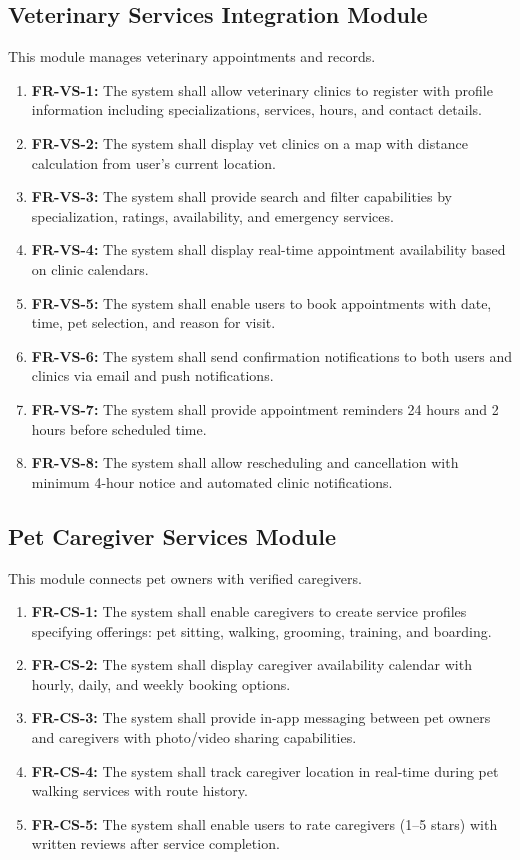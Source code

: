 \subsection{Veterinary Services Integration Module}
This module manages veterinary appointments and records.
\begin{enumerate}
    \item \textbf{FR-VS-1:} The system shall allow veterinary clinics to register with profile information including specializations, services, hours, and contact details.
    \item \textbf{FR-VS-2:} The system shall display vet clinics on a map with distance calculation from user's current location.
    \item \textbf{FR-VS-3:} The system shall provide search and filter capabilities by specialization, ratings, availability, and emergency services.
    \item \textbf{FR-VS-4:} The system shall display real-time appointment availability based on clinic calendars.
    \item \textbf{FR-VS-5:} The system shall enable users to book appointments with date, time, pet selection, and reason for visit.
    \item \textbf{FR-VS-6:} The system shall send confirmation notifications to both users and clinics via email and push notifications.
    \item \textbf{FR-VS-7:} The system shall provide appointment reminders 24 hours and 2 hours before scheduled time.
    \item \textbf{FR-VS-8:} The system shall allow rescheduling and cancellation with minimum 4-hour notice and automated clinic notifications.
\end{enumerate}

\subsection{Pet Caregiver Services Module}
This module connects pet owners with verified caregivers.
\begin{enumerate}
    \item \textbf{FR-CS-1:} The system shall enable caregivers to create service profiles specifying offerings: pet sitting, walking, grooming, training, and boarding.
    \item \textbf{FR-CS-2:} The system shall display caregiver availability calendar with hourly, daily, and weekly booking options.
    \item \textbf{FR-CS-3:} The system shall provide in-app messaging between pet owners and caregivers with photo/video sharing capabilities.
    \item \textbf{FR-CS-4:} The system shall track caregiver location in real-time during pet walking services with route history.
    \item \textbf{FR-CS-5:} The system shall enable users to rate caregivers (1--5 stars) with written reviews after service completion.
\end{enumerate}

